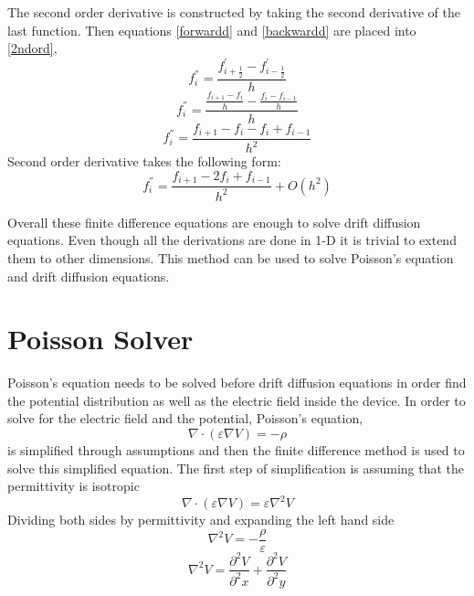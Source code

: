 \begin{doublespace}
The second order derivative is constructed by taking the second derivative of the last function. Then equations \ref{forwardd} and \ref{backwardd} are placed into \ref{2ndord},
\begin{equation}\nonumber
f^{''}_{i}=\frac{f_{i+\frac{1}{2}}^{'}-f_{i-\frac{1}{2}}^{'}}{h}
\end{equation}
\begin{equation}\nonumber
f^{''}_{i}=\frac{\frac{f_{i+1}-f_{i}}{h}-\frac{f_{i}-f_{i-1}}{h}}{h}
\end{equation}
\begin{equation}\nonumber
f^{''}_{i}=\frac{f_{i+1}-f_{i}-f_{i}+f_{i-1}}{h^2}
\end{equation}
Second order derivative  takes the following form:
\begin{equation}
f^{''}_{i}=\frac{f_{i+1}-2f_{i}+f_{i-1}}{h^2}+O(h^2)
\label{fdc2}
\end{equation}

Overall these finite difference equations are enough to solve drift diffusion equations. Even though all the derivations are done in 1-D it is trivial to extend them to other dimensions. This method can be used to solve Poisson's equation and drift diffusion equations.
\clearpage

\section{Poisson Solver}

Poisson's equation needs to be solved before drift diffusion equations in order find the potential distribution as well as the electric field inside the device. In order to solve for the electric field and the potential, Poisson's equation,
\begin{equation}
\nabla \cdot  (\varepsilon \nabla V)=-\rho
\label{Poissons2}
\end{equation}
is simplified through assumptions and then the finite difference method is used to solve this simplified equation\cite{smith1985numerical}. The first step of simplification is assuming that the permittivity is isotropic 
\begin{equation}
\nabla \cdot  (\varepsilon \nabla V)=\varepsilon  \nabla^2 V
\end{equation}
Dividing both sides  by  permittivity and expanding the left hand side 
\begin{equation}
 \nabla^2 V =-\frac{\rho}{\varepsilon}
 \label{Poissons}
\end{equation}
\begin{equation}
 \nabla^2 V =\frac{\partial^2 V}{\partial^2 x}+\frac{\partial^2 V}{\partial^2 y}
\end{equation}


\end{doublespace}

